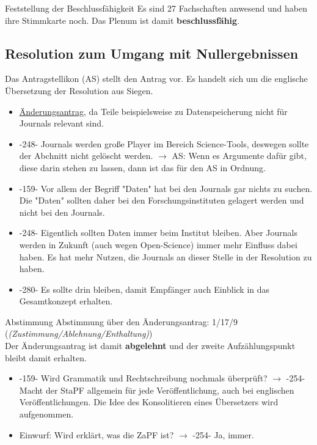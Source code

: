     \begin{success}{Feststellung der Beschlussfähigkeit}
      Es sind 27 Fachschaften anwesend und haben ihre Stimmkarte noch.
      Das Plenum ist damit \textbf{beschlussfähig}.
    \end{success}

  \subsection{Resolution zum Umgang mit Nullergebnissen}
    Das Antragstellikon (AS) stellt den Antrag vor. Es handelt sich um die englische Übersetzung der Resolution aus Siegen.
    \begin{itemize}
      \item \underline{Änderungsantrag}, da Teile beispielsweise zu Datenspeicherung nicht für Journals relevant sind.
      \item -248- Journals werden große Player im Bereich Science-Tools, deswegen sollte der Abchnitt nicht gelöscht werden.
        $\rightarrow$ AS: Wenn es Argumente dafür gibt, diese darin stehen zu lassen, dann ist das für den AS in Ordnung.
      \item -159- Vor allem der Begriff "Daten" hat bei den Journals gar nichts zu suchen. Die "Daten" sollten daher bei den Forschungsinstituten gelagert werden und nicht bei den Journals.
      \item -248- Eigentlich sollten Daten immer beim Institut bleiben. Aber Journals werden in Zukunft (auch wegen Open-Science) immer mehr Einfluss dabei haben.
      Es hat mehr Nutzen, die Journals an dieser Stelle in der Resolution zu haben.
      \item -280- Es sollte drin bleiben, damit Empfänger auch Einblick in das Gesamtkonzept erhalten.
    \end{itemize}

    \begin{danger}{Abstimmung}
      Abstimmung über den Änderungsantrag: 1/17/9 (\textit{(Zustimmung/Ablehnung/Enthaltung)}) \\
      Der Änderungsantrag ist damit \textbf{abgelehnt} und der zweite Aufzählungspunkt bleibt damit erhalten.
    \end{danger}

    \begin{itemize}
      \item -159- Wird Grammatik und Rechtschreibung nochmals überprüft?
        $\rightarrow$ -254- Macht der StaPF allgemein für jede Veröffentlichung, auch bei englischen Veröffentlichungen. Die Idee des Konsolitieren eines Übersetzers wird aufgenommen.
      \item Einwurf: Wird erklärt, was die ZaPF ist?
        $\rightarrow$ -254- Ja, immer.
    \end{itemize}

